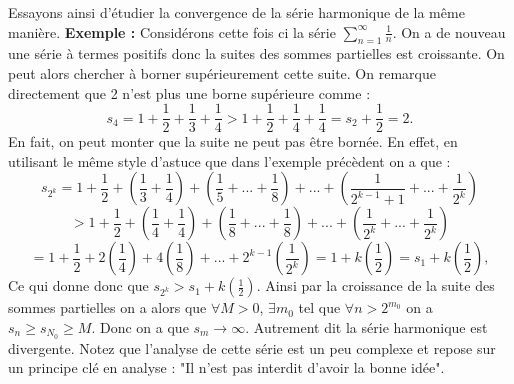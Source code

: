 \documentclass[oneside,12pt,french,table]{book}
\theoremstyle{definition}
\theoremstyle{plain}
\theoremstyle{remark}
\begin{document}
Essayons ainsi d'étudier la convergence de la série harmonique de la même manière. 
 \newline
\textbf{Exemple :} Considérons cette fois ci la série $\sum_{n=1}^{\infty} \frac{1}{n}$. On a de nouveau une série à termes positifs donc la suites des sommes partielles est croissante. On peut alors chercher à borner supérieurement cette suite. On remarque directement que 2 n'est plus une borne supérieure comme :
$$ s_4 = 1 + \frac{1}{2} + \frac{1}{3} + \frac{1}{4} > 1 + \frac{1}{2} + \frac{1}{4} + \frac{1}{4} = s_2 + \frac{1}{2} = 2. $$ 
En fait, on peut monter que la suite ne peut pas être bornée. En effet, en utilisant le même style d'astuce que dans l'exemple précèdent on a que :
$$ s_{2^k} = 1 + \frac{1}{2} + \left (\frac{1}{3}+ \frac{1}{4} \right ) + \left( \frac{1}{5} + ... + \frac{1}{8} \right ) + ... + \left( \frac{1}{2^{k-1}+1} + ... + \frac{1}{2^k} \right ) $$
$$ >  1 + \frac{1}{2} + \left (\frac{1}{4}+ \frac{1}{4} \right ) + \left( \frac{1}{8} + ... + \frac{1}{8} \right ) + ... + \left( \frac{1}{2^{k}} + ... + \frac{1}{2^k} \right ) $$
$$ =  1 + \frac{1}{2} + 2\left (\frac{1}{4} \right ) + 4\left( \frac{1}{8} \right ) + ... + 2^{k-1} \left( \frac{1}{2^{k}} \right ) = 1 + k \left (\frac{1}{2} \right ) = s_1 + k \left (\frac{1}{2} \right ),$$
Ce qui donne donc que $s_{2^k} >  s_1 + k \left (\frac{1}{2} \right ) $. Ainsi par la croissance de la suite des sommes partielles on a alors que $\forall M > 0$, $\exists m_0$ tel que $\forall n > 2^{m_0}$ on a $s_n \ge s_{N_0} \ge M$. Donc on a que $s_m \rightarrow \infty$. Autrement dit la série harmonique est divergente. Notez que l'analyse de cette série est un peu complexe et repose sur un principe clé en analyse : "Il n'est pas interdit d'avoir la bonne idée".\\
\end{document}
